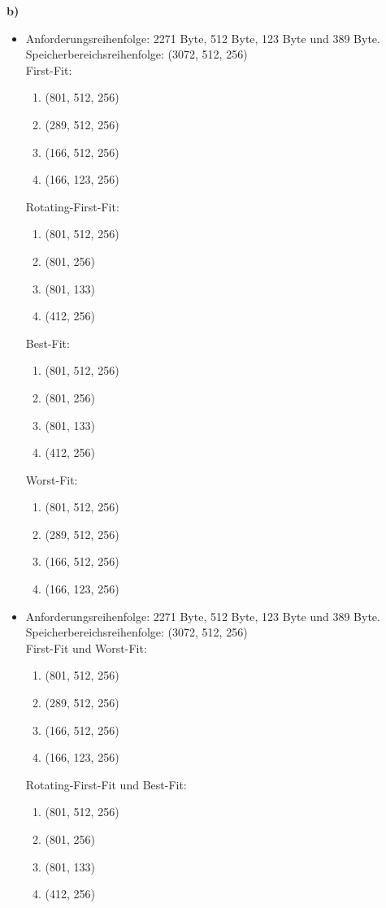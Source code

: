 \documentclass[a4paper,graphics,11pt]{article}
\begin{document}
\textbf{b)}

\begin{itemize}
    \item   Anforderungsreihenfolge: 2271 Byte, 512 Byte, 123 Byte und 389 Byte.\\
            Speicherbereichsreihenfolge: (3072, 512, 256)\\
            First-Fit:
\begin{enumerate}
    \item (801, 512, 256)
    \item (289, 512, 256)
    \item (166, 512, 256)
    \item (166, 123, 256)
\end{enumerate}
Rotating-First-Fit:
\begin{enumerate}
    \item (801, 512, 256)
    \item (801, 256)
    \item (801, 133)
    \item (412, 256)
\end{enumerate}
Best-Fit:
\begin{enumerate}
    \item (801, 512, 256)
    \item (801, 256)
    \item (801, 133)
    \item (412, 256)
\end{enumerate}
Worst-Fit:
\begin{enumerate}
    \item (801, 512, 256)
    \item (289, 512, 256)
    \item (166, 512, 256)
    \item (166, 123, 256)
\end{enumerate}

    \item   Anforderungsreihenfolge: 2271 Byte, 512 Byte, 123 Byte und 389 Byte.\\
            Speicherbereichsreihenfolge: (3072, 512, 256)\\
            First-Fit und Worst-Fit:
            \begin{enumerate}
                \item (801, 512, 256)
                \item (289, 512, 256)
                \item (166, 512, 256)
                \item (166, 123, 256)
            \end{enumerate}
            Rotating-First-Fit und Best-Fit:
            \begin{enumerate}
                \item (801, 512, 256)
                \item (801, 256)
                \item (801, 133)
                \item (412, 256)
            \end{enumerate}


\end{itemize}
\end{document}
